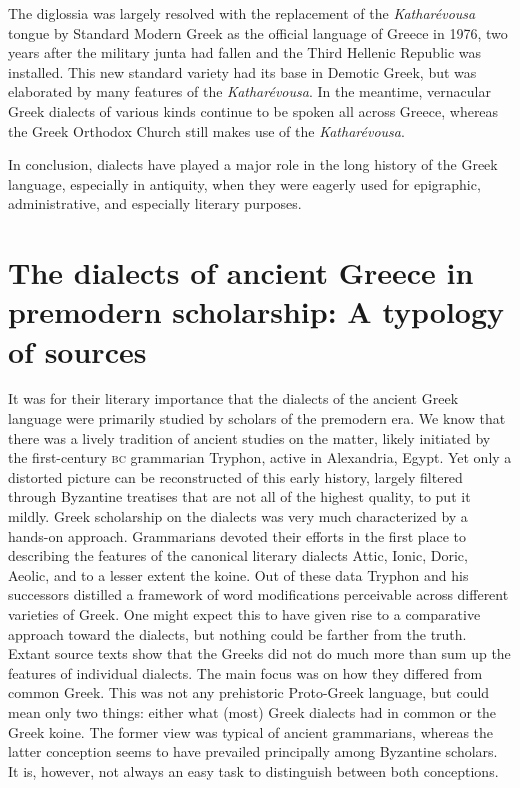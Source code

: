 The diglossia was largely resolved with the replacement of the \textit{Katharévousa} tongue by Standard Modern Greek as the official language of Greece in 1976, two years after the military junta had fallen and the Third Hellenic Republic was installed. This new standard variety had its base in Demotic Greek, but was elaborated by many features of the \textit{Katharévousa}. In the meantime, vernacular Greek dialects of various kinds continue to be spoken all across Greece, whereas the Greek Orthodox Church still makes use of the \textit{Katharévousa}.

In conclusion, dialects have played a major role in the long history of the Greek language, especially in antiquity, when they were eagerly used for epigraphic, administrative, and especially literary purposes.

\section{The dialects of ancient Greece in premodern scholarship: A typology of sources}

It was for their literary importance that the dialects of the ancient Greek language were primarily studied by scholars of the premodern era. We know that there was a lively tradition of ancient studies on the matter, likely initiated by the first-century \textsc{bc} grammarian Tryphon, active in Alexandria, Egypt. Yet only a distorted picture can be reconstructed of this early history, largely filtered through Byzantine treatises that are not all of the highest quality, to put it mildly. Greek scholarship on the dialects was very much characterized by a hands-on approach. Grammarians devoted their efforts in the first place to describing the features of the canonical literary dialects Attic, Ionic, Doric, Aeolic, and to a lesser extent the koine. Out of these data Tryphon and his successors distilled a framework of word modifications perceivable across different varieties of Greek. One might expect this to have given rise to a comparative approach toward the dialects, but nothing could be farther from the truth. Extant source texts show that the Greeks did not do much more than sum up the features of individual dialects. The main focus was on how they differed from common Greek. This was not any prehistoric Proto-Greek language, but could mean only two things: either what (most) Greek dialects had in common or the Greek koine. The former view was typical of ancient grammarians, whereas the latter conception seems to have prevailed principally among Byzantine scholars. It is, however, not always an easy task to distinguish between both conceptions.

